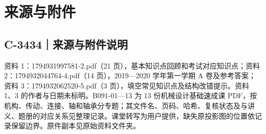 \documentclass[zihao=5,a4paper,UTF8,fontset=fandol]{ctexart}
\begin{document}
\section{来源与附件}




\subsection{C-3434｜来源与附件说明}
\label{c-3434}

资料 1：1794931997581-2.pdf（21 页），基本知识点回顾和考试对应知识点；资料 2：1794932044764-4.pdf（14 页），2019—2020 学年第一学期 A 卷及参考答案；资料 3：1794932062520-5.pdf（3 页），填空常见知识点及结构改错提示。资料 1、3 的作者与日期未标明。B091-01—13 为 13 份机械设计基础速成课 PDF，按机构、传动、连接、轴和轴承分专题；其文件名、页码、哈希、复核状态及与讲义、题册的对应关系见整理记录。课堂转写为用户提供，缺失原投影图的位置依记录保留边界。原件副本见原始资料文件夹。
\end{document}
